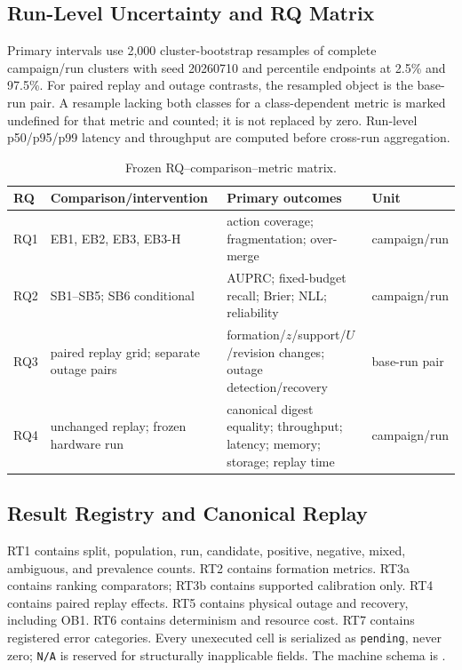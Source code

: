 \subsection{Run-Level Uncertainty and RQ Matrix}

Primary intervals use 2,000 cluster-bootstrap resamples of complete campaign/run clusters with
seed 20260710 and percentile endpoints at 2.5\% and 97.5\%. For paired replay and outage
contrasts, the resampled object is the base-run pair. A resample lacking both classes for a
class-dependent metric is marked undefined for that metric and counted; it is not replaced by
zero. Run-level p50/p95/p99 latency and throughput are computed before cross-run aggregation.

\begin{table}[b]
\caption{Frozen RQ--comparison--metric matrix.}
\label{tab:rq-matrix}
\centering
\small
\begin{tabular}{p{}p{}p{}p{}}
\toprule
\textbf{RQ} & \textbf{Comparison/intervention} & \textbf{Primary outcomes} & \textbf{Unit} \\
\midrule
RQ1 & EB1, EB2, EB3, EB3-H & action coverage; fragmentation; over-merge & campaign/run \\
RQ2 & SB1--SB5; SB6 conditional & AUPRC; fixed-budget recall; Brier; NLL; reliability & campaign/run \\
RQ3 & paired replay grid; separate outage pairs & formation/$z$/support/$U$/revision changes; outage detection/recovery & base-run pair \\
RQ4 & unchanged replay; frozen hardware run & canonical digest equality; throughput; latency; memory; storage; replay time & campaign/run \\
\bottomrule
\end{tabular}
\end{table}

\subsection{Result Registry and Canonical Replay}
\label{app:result-shells}

RT1 contains split, population, run, candidate, positive, negative, mixed, ambiguous, and
prevalence counts. RT2 contains formation metrics. RT3a contains ranking comparators; RT3b
contains supported calibration only. RT4 contains paired replay effects. RT5 contains physical
outage and recovery, including OB1. RT6 contains determinism and resource cost. RT7 contains
registered error categories. Every unexecuted cell is serialized as \texttt{pending}, never
zero; \texttt{N/A} is reserved for structurally inapplicable fields. The machine schema is
.

